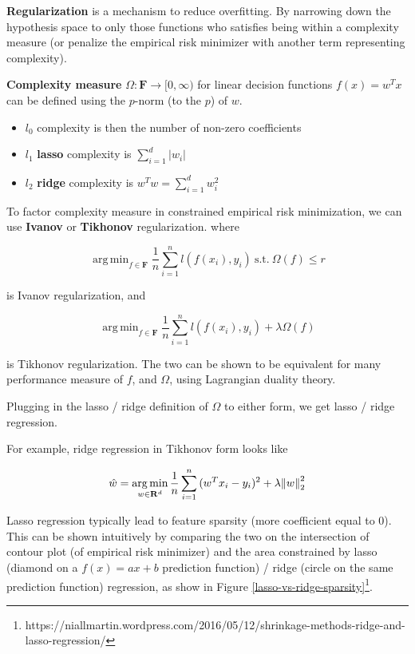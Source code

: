 \documentclass{article}
\DeclareMathOperator*{\argmin}{arg\,min}
\begin{document}
\textbf{Regularization} is a mechanism to reduce overfitting.
By narrowing down the hypothesis space to only those functions who satisfies being within a complexity measure (or penalize the empirical risk minimizer with another term representing complexity).

\textbf{Complexity measure} $\Omega : \mathbf{F} \to [0, \infty)$ for linear decision functions $f(x) = w^{T} x$ can be defined using the $p$-norm (to the $p$) of $w$.

\begin{itemize}
  \item $\mathit{l}_0$ complexity is then the number of non-zero coefficients
  \item $\mathit{l}_1$ \textbf{lasso} complexity is $\sum_{i = 1}^{d}{|w_i|}$
  \item $\mathit{l}_2$ \textbf{ridge} complexity is $w^{T} w = \sum_{i = 1}^{d}{w_{i}^{2}}$
\end{itemize}

To factor complexity measure in constrained empirical risk minimization, we can use \textbf{Ivanov} or \textbf{Tikhonov} regularization. where

$$
\argmin_{f \in \mathbf{F}}{\frac{1}{n} \sum_{i = 1}^{n}{\mathit{l}(f(x_i), y_i)}} ~ \text{s.t.} ~ \Omega(f) \leq r
$$

is Ivanov regularization, and

$$
\argmin_{f \in \mathbf{F}}{\frac{1}{n} \sum_{i = 1}^{n}{\mathit{l}(f(x_i), y_i)} + \lambda \Omega(f)}
$$

is Tikhonov regularization.
The two can be shown to be equivalent for many performance measure of $f$, and $\Omega$, using Lagrangian duality theory.

Plugging in the lasso / ridge definition of $\Omega$ to either form, we get lasso / ridge regression.

For example, ridge regression in Tikhonov form looks like

$$
\hat{w} = \argmin_{w \in \mathbf{R}^{d}}{\frac{1}{n} \sum_{i = 1}^{n}{(w^{T} x_i - y_i)^2} + \lambda \norm{w}_2^2}
$$

Lasso regression typically lead to feature sparsity (more coefficient equal to $0$).
This can be shown intuitively by comparing the two on the intersection of contour plot (of empirical risk minimizer) and the area constrained by lasso (diamond on a $f(x) = ax + b$ prediction function) / ridge (circle on the same prediction function) regression, as show in Figure \ref{lasso-vs-ridge-sparsity}\footnote{https://niallmartin.wordpress.com/2016/05/12/shrinkage-methods-ridge-and-lasso-regression/}.
\end{document}
